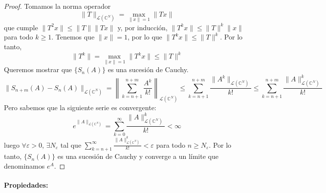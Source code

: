 \begin{proof}
    Tomamos la norma operador
    \[
        \|T\|_{\mathcal{L}(\mathbb{C}^N)} = \max_{\|x\|=1} \|Tx\|
    \]
    que cumple $\|T^2x\| \le \|T\| \|Tx\|$ y, por inducción, $\|T^k x\| \le \|T\|^k \|x\|$ para todo $k \ge 1$.
    Tenemos que $\|x\| = 1$, por lo que $\|T^k x\| \le \|T\|^k$. Por lo tanto,
    \[
        \|T^k\| = \max_{\|x\|=1} \|T^k x\| \le \|T\|^k
    \]
    Queremos mostrar que $\{S_n(A)\}$ es una sucesión de Cauchy. 
    \[
        \|S_{n+m} (A) - S_n(A)\|_{\mathcal{L}(\mathbb{C}^N)} = \left\| \sum_{k=n+1}^{n+m} \frac{A^k}{k!} \right\|_{\mathcal{L}(\mathbb{C}^N)} \le \sum_{k=n+1}^{n+m} \frac{\|A^k\|_{\mathcal{L}(\mathbb{C}^N)}}{k!} \le \sum_{k=n+1}^{n+m} \frac{\|A\|_{\mathcal{L}(\mathbb{C}^N)}^k}{k!}
    \]
    Pero sabemos que la siguiente serie es convergente:
    \[
        e^{\|A\|_{\mathcal{L}(\mathbb{C}^N)}} = \sum_{k=0}^\infty \frac{\|A\|_{\mathcal{L}(\mathbb{C}^N)}^k}{k!} < \infty
    \]
    luego $\forall \varepsilon > 0$, $\exists N_\varepsilon$ tal que $\sum_{k=n+1}^\infty \frac{\|A\|_{\mathcal{L}(\mathbb{C}^N)}^k}{k!} < \varepsilon$ para todo $n \ge N_\varepsilon$. Por lo tanto, $\{S_n(A)\}$ es una sucesión de Cauchy y converge a un límite que denominamos $e^A$.
\end{proof}


\paragraph{Propiedades:}

